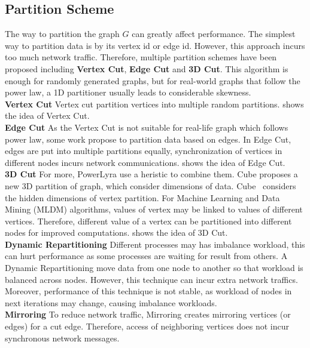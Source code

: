 \subsection{Partition Scheme}
The way to partition the graph $G$ can greatly affect performance.
The simplest way to partition data is by its vertex id or edge id.
However, this approach incurs too much network traffic. Therefore,
multiple partition schemes have been proposed including \textbf{Vertex Cut},
\textbf{Edge Cut} and \textbf{3D Cut}.
This algorithm is enough for randomly generated
graphs, but for real-world graphs that follow the
power law, a 1D partitioner usually leads to considerable
skewness.\\
\textbf{Vertex Cut} Vertex cut partition vertices into multiple
random partitions.  shows the idea of Vertex Cut. \\
\textbf{Edge Cut} As the Vertex Cut is not suitable for real-life
graph which follows power law, some work propose to partition
data based on edges. In Edge Cut, edges are put into multiple
partitions equally, synchronization of vertices in different nodes
incurs network communications.  shows the idea of
Edge Cut. \\
\textbf{3D Cut}
For more, PowerLyra use a heristic to combine them.
Cube proposes a new 3D partition of graph, which consider dimensions of data.
Cube~\cite{cube:osid16} considers the hidden dimensions of vertex partition.
For Machine Learning and Data Mining (MLDM) algorithms, values of vertex
may be linked to values of different vertices. Therefore, different value of a vertex
can be partitioned into different nodes for improved computations. 
shows the idea of 3D Cut. \\
\textbf{Dynamic Repartitioning}
Different processes may has imbalance workload, this can hurt performance
as some processes are waiting for result from others. A Dynamic Repartitioning
move data from one node to another so that workload is balanced across
nodes. However, this technique can incur extra network traffics. Moreover,
performance of this technique is not stable, as workload of nodes in next
iterations may change, causing imbalance workloads.\\
\textbf{Mirroring}
To reduce network traffic, Mirroring creates mirroring vertices (or edges)
for a cut edge. Therefore, access of neighboring vertices does not
incur synchronous network messages.


